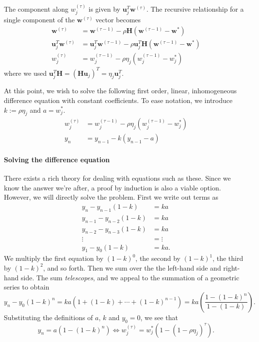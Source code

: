 \documentclass[12pt, a4paper]{article}
\newcommand{\vect}[1]{\bm{#1}}
\begin{document}
The component along $w^{(\tau)}_j$ is given by $\vect{u}_j^T \vect{w}^{(\tau)}$.
The recursive relationship for a single component of the $\vect{w}^{(\tau)}$ vector becomes
\begin{align*}
	\vect{w}^{(\tau)} &= \vect{w}^{(\tau - 1)} - \rho \vect{H} (\vect{w}^{(\tau - 1)} - \vect{w}^*) \\
	\vect{u}_j^T \vect{w}^{(\tau)} &= \vect{u}_j^T \vect{w}^{(\tau - 1)} - \rho \vect{u}_j^T \vect{H} (\vect{w}^{(\tau - 1)} - \vect{w}^*) \\
	w^{(\tau)}_j &= w^{(\tau - 1)}_j  - \rho \eta_j ( w^{(\tau - 1)}_j - w^{*}_j)
\end{align*}
where we used $\vect{u}_j^T \vect{H} = \left( \vect{H} \vect{u}_j  \right)^T = \eta_j \vect{u}_j^T$.

At this point, we wish to solve the following first order, linear, inhomogeneous difference equation with constant coefficients.
To ease notation, we introduce $k := \rho \eta_j$ and $a = w^{*}_j$.
\begin{align*}
	w^{(\tau)}_j &= w^{(\tau - 1)}_j  - \rho \eta_j ( w^{(\tau - 1)}_j - w^{*}_j) \\
	y_n &= y_{n-1}  - k ( y_{n-1}  - a)
\end{align*}

\paragraph{Solving the difference equation} There exists a rich theory for dealing with equations such as these.
Since we know the answer we're after, a proof by induction is also a viable option.
However, we will directly solve the problem.
First we write out terms as
\begin{align*}
	y_n - y_{n-1}(1 - k)&= ka \\
	y_{n-1} - y_{n-2}(1 - k)&= ka \\
	y_{n-2} - y_{n-3}(1 - k)&= ka \\
	\vdots &= \vdots \\
	y_1 - y_{0}(1 - k)&= ka.
\end{align*}
We multiply the first equation by $(1-k)^0$, the second by $(1-k)^1$, the third by $(1-k)^2$, and so forth.
Then we sum over the the left-hand side and right-hand side. 
The sum \emph{telescopes}, and we appeal to the summation of a geometric series to obtain
\begin{equation*}
	y_n - y_{0}(1 - k)^n 
	= ka \left( 1 + (1-k) + \cdots + (1-k)^{n-1} \right)
	= ka \left(  \frac{1 - (1-k)^n}{1 - (1-k)} \right).
\end{equation*}
Substituting the definitions of $a$, $k$ and $y_0 = 0$, we see that
\begin{equation*}
	y_n = a \left( 1 - (1-k)^n \right) 
	\iff 
	w^{(\tau)}_j = w^{*}_j \left( 1 - (1- \rho \eta_j)^\tau \right) .
\end{equation*}
\end{document}
